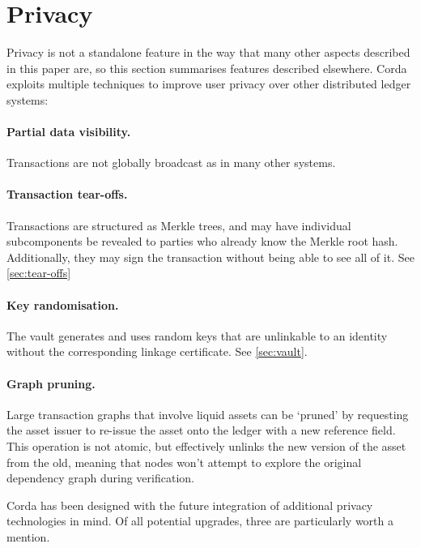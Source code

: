 \documentclass{article}
\begin{document}

\section{Privacy}

Privacy is not a standalone feature in the way that many other aspects described in this paper are, so this section
summarises features described elsewhere. Corda exploits multiple techniques to improve user privacy over other
distributed ledger systems:

\paragraph{Partial data visibility.}Transactions are not globally broadcast as in many other systems.
\paragraph{Transaction tear-offs.}Transactions are structured as Merkle trees, and may have individual subcomponents be
revealed to parties who already know the Merkle root hash. Additionally, they may sign the transaction without being
able to see all of it. See \cref{sec:tear-offs}
\paragraph{Key randomisation.}The vault generates and uses random keys that are unlinkable to an identity without the
corresponding linkage certificate. See \cref{sec:vault}.
\paragraph{Graph pruning.}Large transaction graphs that involve liquid assets can be `pruned' by requesting the asset
issuer to re-issue the asset onto the ledger with a new reference field. This operation is not atomic, but effectively
unlinks the new version of the asset from the old, meaning that nodes won't attempt to explore the original dependency
graph during verification.

Corda has been designed with the future integration of additional privacy technologies in mind. Of all potential
upgrades, three are particularly worth a mention.
\end{document}
